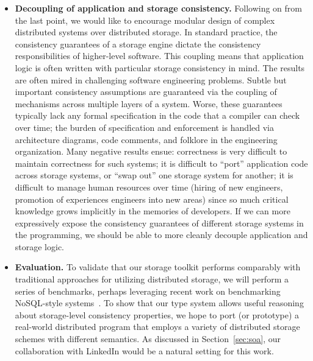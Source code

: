 \begin{itemize}
\item \textbf{Decoupling of application and storage consistency.}  Following on from the last point, we would like to encourage modular design of complex distributed systems over distributed storage.  In standard practice, the consistency guarantees of a storage engine dictate the consistency responsibilities of higher-level software.  This coupling means that application logic is often written with particular storage consistency in mind.  The results are often mired in challenging software engineering problems.  Subtle but important consistency assumptions are guaranteed via the coupling of mechanisms across multiple layers of a system.  Worse, these guarantees typically lack any formal specification in the code that a compiler can check over time; the burden of specification and enforcement is handled via architecture diagrams, code comments, and folklore in the engineering organization.  Many negative results ensue: correctness is very difficult to maintain correctness for such systems; it is difficult to ``port'' application code across storage systems, or ``swap out'' one storage system for another; it is difficult to manage human resources over time (hiring of new engineers, promotion of experiences engineers into new areas) since so much critical knowledge grows implicitly in the memories of developers.  If we can more expressively expose the consistency guarantees of different storage systems in the programming, we should be able to more cleanly decouple application and storage logic.

\item \textbf{Evaluation.} To validate that our storage toolkit performs
  comparably with traditional approaches for utilizing distributed storage, we
  will perform a series of benchmarks, perhaps leveraging recent work on benchmarking
  NoSQL-style systems~\cite{ycsb}. To show that our type system allows useful
  reasoning about storage-level consistency properties, we hope to port (or
  prototype) a real-world distributed program that employs a variety of
  distributed storage schemes with different semantics. As discussed in
  Section~\ref{sec:soa}, our collaboration with LinkedIn would be a natural
  setting for this work.
\end{itemize}

